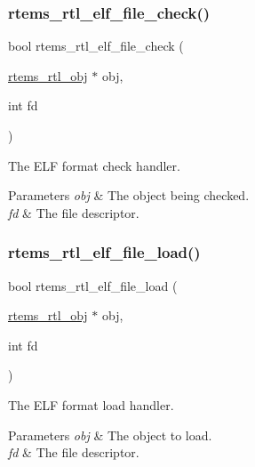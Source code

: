 \subsubsection{\texorpdfstring{rtems\_rtl\_elf\_file\_check()}{rtems\_rtl\_elf\_file\_check()}}
{\footnotesize\ttfamily bool rtems\+\_\+rtl\+\_\+elf\+\_\+file\+\_\+check (\begin{DoxyParamCaption}\item[{\mbox{\hyperlink{structrtems__rtl__obj}{rtems\+\_\+rtl\+\_\+obj}} $\ast$}]{obj,  }\item[{int}]{fd }\end{DoxyParamCaption})}

The E\+LF format check handler.


\begin{DoxyParams}{Parameters}
{\em obj} & The object being checked. \\
\hline
{\em fd} & The file descriptor. \\
\hline
\end{DoxyParams}
\mbox{\label{rtl-elf_8c_a6432bdb0006ee34a7b89b3f3088aa5b5}} 
\subsubsection{\texorpdfstring{rtems\_rtl\_elf\_file\_load()}{rtems\_rtl\_elf\_file\_load()}}
{\footnotesize\ttfamily bool rtems\+\_\+rtl\+\_\+elf\+\_\+file\+\_\+load (\begin{DoxyParamCaption}\item[{\mbox{\hyperlink{structrtems__rtl__obj}{rtems\+\_\+rtl\+\_\+obj}} $\ast$}]{obj,  }\item[{int}]{fd }\end{DoxyParamCaption})}

The E\+LF format load handler.


\begin{DoxyParams}{Parameters}
{\em obj} & The object to load. \\
\hline
{\em fd} & The file descriptor. \\
\hline
\end{DoxyParams}
\mbox{\label{rtl-elf_8c_a89a86f305b09923b92f18b72a5478427}} 
